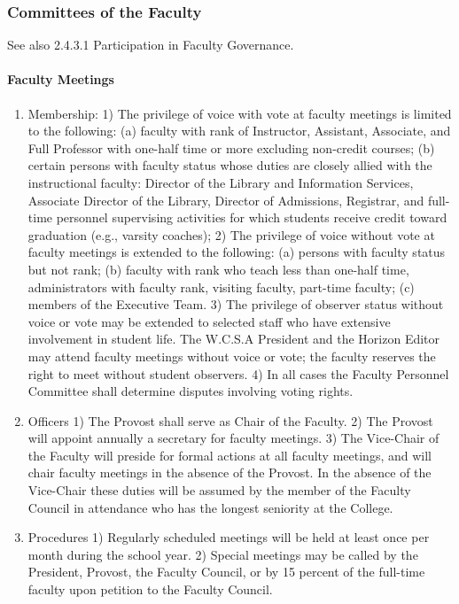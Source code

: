 \documentclass[letterpaper, 11pt]{article}
\begin{document}
		\subsubsection{Committees of the Faculty}
			See also 2.4.3.1 Participation in Faculty Governance.
			\paragraph{Faculty Meetings}
				\begin{enumerate}[label=\alph*)]
					\item{Membership:}
					1) The privilege of voice with vote at faculty meetings is limited to the following:
					(a) faculty with rank of Instructor, Assistant, Associate, and Full Professor with one-half time or more excluding non-credit courses;
					(b) certain persons with faculty status whose duties are closely allied with the instructional faculty:  Director of the Library and Information Services, Associate Director of the Library, Director of Admissions, Registrar, and full-time personnel supervising activities for which students receive credit toward graduation (e.g., varsity coaches);
					2) The privilege of voice without vote at faculty meetings is extended to the following:
					(a) persons with faculty status but not rank;
					(b) faculty with rank who teach less than one-half time, administrators with faculty rank, visiting faculty, part-time faculty;
					(c) members of the Executive Team.
					3) The privilege of observer status without voice or vote may be extended to selected staff who have extensive involvement in student life.  The W.C.S.A President and the Horizon Editor may attend faculty meetings without voice or vote; the faculty reserves the right to meet without student observers.
					4) In all cases the Faculty Personnel Committee shall determine disputes involving voting rights.
					\item{Officers}
					1) The Provost shall serve as Chair of the Faculty.
					2) The Provost will appoint annually a secretary for faculty meetings.
					3) The Vice-Chair of the Faculty will preside for formal actions at all faculty meetings, and will chair faculty meetings in the absence of the Provost.  In the absence of the Vice-Chair these duties will be assumed by the member of the Faculty Council in attendance who has the longest seniority at the College.
					\item{Procedures}
					1) Regularly scheduled meetings will be held at least once per month during the school year.
					2) Special meetings may be called by the President, Provost, the Faculty Council, or by 15 percent of the full-time faculty upon petition to the Faculty Council.

\end{enumerate}
\end{document}
